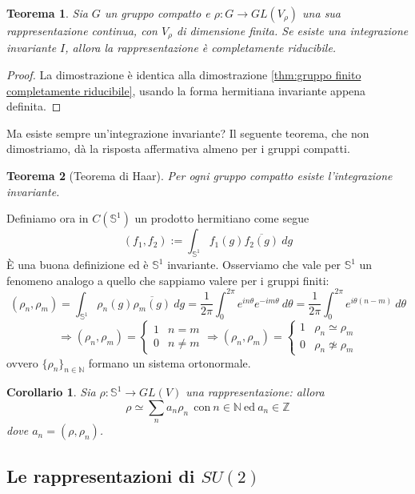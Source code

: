 \documentclass[11pt]{article}
\theoremstyle{plain}
\newtheorem{thm}{Teorema}[section]
\newtheorem*{cor}{Corollario}
\theoremstyle{definition}
\theoremstyle{remark}
\newcommand{\Z}{\mathbb{Z}}
\newcommand{\N}{\mathbb{N}}
\newcommand{\dint}{\displaystyle\int}
\DeclareMathOperator{\iso}{\simeq}
\DeclareMathOperator{\noniso}{\not\simeq}
\begin{document}
\begin{thm} Sia $G$ un gruppo compatto e $\rho : G \to GL(V_\rho)$ una sua rappresentazione continua, con $V_\rho$ di dimensione finita. Se esiste una integrazione invariante $I$, allora la rappresentazione è completamente riducibile.

\end{thm}

\begin{proof}
  La dimostrazione è identica alla dimostrazione \ref{thm:gruppo finito completamente riducibile}, usando la forma hermitiana invariante appena definita.
\end{proof}

Ma esiste sempre un'integrazione invariante? Il seguente teorema, che non dimostriamo, dà la risposta affermativa almeno per i gruppi compatti.
\begin{thm}[Teorema di Haar]
Per ogni gruppo compatto esiste l'integrazione invariante.
\end{thm}

Definiamo ora in $C(\mathbb{S}^1)$ un prodotto hermitiano come segue
\[(f_1,f_2):=\dint_{\mathbb{S}^1}f_1(g)\overline{f_2(g)}\ dg\]
\`E una buona definizione ed è $\mathbb{S}^1$ invariante.
Osserviamo che vale per $\mathbb{S}^1$ un fenomeno analogo a quello che sappiamo valere per i gruppi finiti:
\[(\rho_n,\rho_m)=\dint_{\mathbb{S}^1}\rho_n(g)\overline{\rho_m(g)}\ dg=\frac{1}{2\pi}\dint_0^{2\pi}e^{in\theta}e^{-im\theta}\ d\theta=\frac{1}{2\pi}\dint_0^{2\pi}e^{i\theta (n-m)}\ d\theta \]
\[\Rightarrow (\rho_n,\rho_m)=\left\{\begin{matrix}
1 & n=m\\
0 & n\neq m
\end{matrix}\right.\Rightarrow (\rho_n,\rho_m)=\left\{\begin{matrix}
1 & \rho_n\iso \rho_m\\
0 & \rho_n \noniso \rho_m
\end{matrix}\right.\]
ovvero $\{\rho_n\}_{n\in \N}$ formano un sistema ortonormale.

\begin{cor} Sia $\rho: \mathbb{S}^1\rightarrow GL(V)$ una rappresentazione: allora
\[\rho\iso \sum_n a_n\rho_n\ \ \text{con}\ n\in \N\ \text{ed}\ a_n\in \Z\]
dove $a_n=(\rho,\rho_n)$.
\end{cor}





\subsection{Le rappresentazioni di $SU(2)$}
\end{document}
